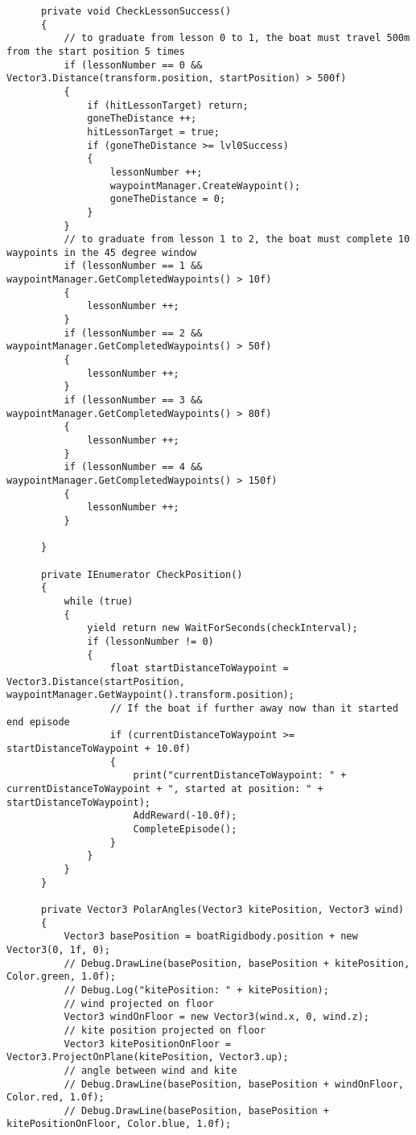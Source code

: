 \begin{lstlisting}
      private void CheckLessonSuccess()
      {
          // to graduate from lesson 0 to 1, the boat must travel 500m from the start position 5 times
          if (lessonNumber == 0 && Vector3.Distance(transform.position, startPosition) > 500f)
          {
              if (hitLessonTarget) return;
              goneTheDistance ++;
              hitLessonTarget = true;
              if (goneTheDistance >= lvl0Success)
              {
                  lessonNumber ++;
                  waypointManager.CreateWaypoint();
                  goneTheDistance = 0;
              }
          }
          // to graduate from lesson 1 to 2, the boat must complete 10 waypoints in the 45 degree window
          if (lessonNumber == 1 && waypointManager.GetCompletedWaypoints() > 10f)
          {
              lessonNumber ++;
          }
          if (lessonNumber == 2 && waypointManager.GetCompletedWaypoints() > 50f)
          {
              lessonNumber ++;
          }
          if (lessonNumber == 3 && waypointManager.GetCompletedWaypoints() > 80f)
          {
              lessonNumber ++;
          }
          if (lessonNumber == 4 && waypointManager.GetCompletedWaypoints() > 150f)
          {
              lessonNumber ++;
          }
  
      }
  
      private IEnumerator CheckPosition()
      {
          while (true)
          {
              yield return new WaitForSeconds(checkInterval);
              if (lessonNumber != 0)
              {
                  float startDistanceToWaypoint = Vector3.Distance(startPosition, waypointManager.GetWaypoint().transform.position);
                  // If the boat if further away now than it started end episode
                  if (currentDistanceToWaypoint >= startDistanceToWaypoint + 10.0f)
                  {               
                      print("currentDistanceToWaypoint: " + currentDistanceToWaypoint + ", started at position: " + startDistanceToWaypoint);
                      AddReward(-10.0f);
                      CompleteEpisode();
                  }
              }
          }
      }
  
      private Vector3 PolarAngles(Vector3 kitePosition, Vector3 wind)
      {
          Vector3 basePosition = boatRigidbody.position + new Vector3(0, 1f, 0);
          // Debug.DrawLine(basePosition, basePosition + kitePosition, Color.green, 1.0f);
          // Debug.Log("kitePosition: " + kitePosition);
          // wind projected on floor
          Vector3 windOnFloor = new Vector3(wind.x, 0, wind.z);
          // kite position projected on floor
          Vector3 kitePositionOnFloor = Vector3.ProjectOnPlane(kitePosition, Vector3.up);
          // angle between wind and kite
          // Debug.DrawLine(basePosition, basePosition + windOnFloor, Color.red, 1.0f);
          // Debug.DrawLine(basePosition, basePosition + kitePositionOnFloor, Color.blue, 1.0f);
  

\end{lstlisting}
